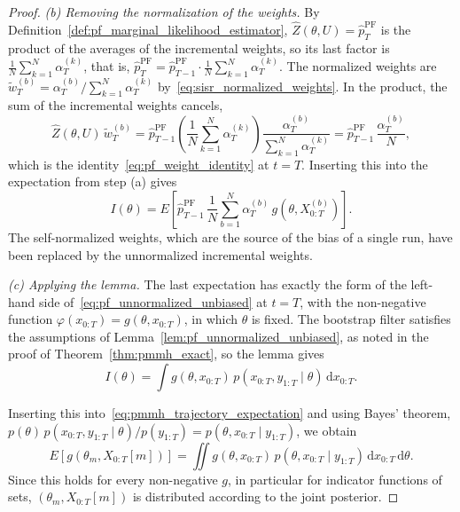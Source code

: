 \begin{proof}
    \emph{(b) Removing the normalization of the weights.} By Definition~\ref{def:pf_marginal_likelihood_estimator}, $\hat{Z}(\theta,U) = \hat{p}^{\mathrm{PF}}_T$ is the product of the averages of the incremental weights, so its last factor is $\frac{1}{N}\sum_{k=1}^{N}\alpha_T^{(k)}$, that is, $\hat{p}^{\mathrm{PF}}_T = \hat{p}^{\mathrm{PF}}_{T-1}\cdot\frac{1}{N}\sum_{k=1}^{N}\alpha_T^{(k)}$. The normalized weights are $\tilde{w}_T^{(b)} = \alpha_T^{(b)}/\sum_{k=1}^{N}\alpha_T^{(k)}$ by~\eqref{eq:sisr_normalized_weights}. In the product, the sum of the incremental weights cancels,
    \begin{equation}
        \hat{Z}(\theta,U)\,\tilde{w}_T^{(b)} = \hat{p}^{\mathrm{PF}}_{T-1}\left(\frac{1}{N}\sum_{k=1}^{N}\alpha_T^{(k)}\right)\frac{\alpha_T^{(b)}}{\sum_{k=1}^{N}\alpha_T^{(k)}} = \hat{p}^{\mathrm{PF}}_{T-1}\,\frac{\alpha_T^{(b)}}{N},
    \end{equation}
    which is the identity~\eqref{eq:pf_weight_identity} at $t=T$. Inserting this into the expectation from step (a) gives
    \begin{equation}
        I(\theta) = E\left[\hat{p}^{\mathrm{PF}}_{T-1}\,\frac{1}{N}\sum_{b=1}^{N}\alpha_T^{(b)}\,g\left(\theta,X_{0:T}^{(b)}\right)\right].
    \end{equation}
    The self-normalized weights, which are the source of the bias of a single run, have been replaced by the unnormalized incremental weights.

    \emph{(c) Applying the lemma.} The last expectation has exactly the form of the left-hand side of~\eqref{eq:pf_unnormalized_unbiased} at $t=T$, with the non-negative function $\varphi(x_{0:T}) = g(\theta,x_{0:T})$, in which $\theta$ is fixed. The bootstrap filter satisfies the assumptions of Lemma~\ref{lem:pf_unnormalized_unbiased}, as noted in the proof of Theorem~\ref{thm:pmmh_exact}, so the lemma gives
    \begin{equation}
        I(\theta) = \int g(\theta,x_{0:T})\,p(x_{0:T},y_{1:T}\mid\theta)\,\mathrm{d}x_{0:T}.
    \end{equation}

    Inserting this into~\eqref{eq:pmmh_trajectory_expectation} and using Bayes' theorem, $p(\theta)\,p(x_{0:T},y_{1:T}\mid\theta)/p(y_{1:T}) = p(\theta,x_{0:T}\mid y_{1:T})$, we obtain
    \begin{equation}
        E\left[g\left(\theta_m,X_{0:T}[m]\right)\right] = \iint g(\theta,x_{0:T})\,p(\theta,x_{0:T}\mid y_{1:T})\,\mathrm{d}x_{0:T}\,\mathrm{d}\theta.
    \end{equation}
    Since this holds for every non-negative $g$, in particular for indicator functions of sets, $(\theta_m,X_{0:T}[m])$ is distributed according to the joint posterior.
\end{proof}

